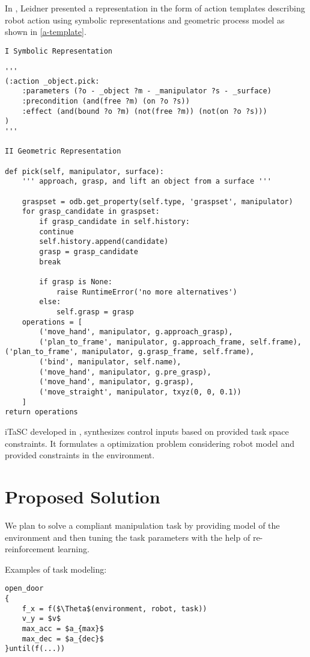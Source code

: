 \documentclass[thesis]{mas_proposal}
\begin{document}
In \cite{leidner2017cognitive}, Leidner presented a representation in the form of action templates describing robot action using symbolic representations and geometric process model as shown in \ref{a-template}.  

\begin{lstlisting}[label=a-template,caption=Action Template: \_object.pick]
I Symbolic Representation 

'''
(:action _object.pick: 
	:parameters (?o - _object ?m - _manipulator ?s - _surface) 
	:precondition (and(free ?m) (on ?o ?s)) 
	:effect (and(bound ?o ?m) (not(free ?m)) (not(on ?o ?s)))
) 
''' 

II Geometric Representation

def pick(self, manipulator, surface):
	''' approach, grasp, and lift an object from a surface '''

	graspset = odb.get_property(self.type, 'graspset', manipulator) 
	for grasp_candidate in graspset: 
		if grasp_candidate in self.history: 
		continue
		self.history.append(candidate) 
		grasp = grasp_candidate 
		break

		if grasp is None: 
			raise RuntimeError('no more alternatives')
		else: 
			self.grasp = grasp
	operations = [
		('move_hand', manipulator, g.approach_grasp), 
		('plan_to_frame', manipulator, g.approach_frame, self.frame), ('plan_to_frame', manipulator, g.grasp_frame, self.frame), 
		('bind', manipulator, self.name), 
		('move_hand', manipulator, g.pre_grasp), 
		('move_hand', manipulator, g.grasp), 
		('move_straight', manipulator, txyz(0, 0, 0.1))
	] 
return operations
\end{lstlisting}

iTaSC developed in \cite{DeSchutter-ijrr2007, DecreBruyninckxDeSchutter2013, decre09}, synthesizes control inputs based on provided task space constraints. It formulates a optimization problem considering robot model and provided constraints in the environment. 


\chapter{Proposed Solution}

We plan to solve a compliant manipulation task by providing model of the environment and then tuning the task parameters with the help of re-reinforcement learning.

Examples of task modeling: 

\begin{lstlisting}[label=open_door_ts,caption=Task specification for opening door]
open_door
{
	f_x = f($\Theta$(environment, robot, task))
	v_y = $v$
	max_acc = $a_{max}$
	max_dec = $a_{dec}$
}until(f(...))

\end{lstlisting}
\end{document}
